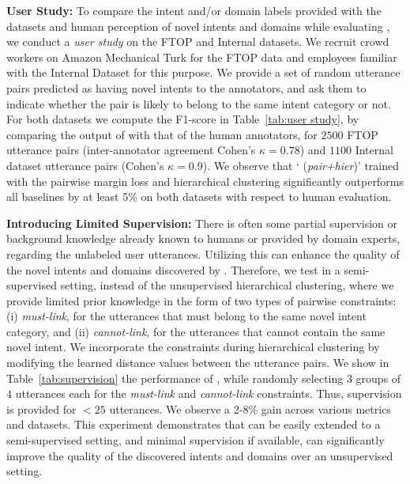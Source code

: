 \smallskip

\noindent \textbf{User Study: }
To compare the intent and/or domain labels provided with the datasets and human perception of novel intents and domains while evaluating \mname{}, we conduct a \textit{user study} on the FTOP and Internal datasets.  We recruit crowd workers on Amazon Mechanical Turk for the FTOP data and employees familiar with the Internal Dataset for this purpose. We provide a set of random utterance pairs predicted as having novel intents to the annotators, and ask them to indicate whether the pair is likely to belong to the same intent category or not. 
For both datasets we compute the F1-score in Table~\ref{tab:user study}, by comparing the output of \mname{} with that of the human annotators, for $2500$ FTOP utterance pairs (inter-annotator agreement Cohen's $\kappa = 0.78$) and $1100$ Internal dataset utterance pairs (Cohen's $\kappa = 0.9$). 
We observe that `\mname{} (\textit{pair+hier})' trained with the pairwise margin loss and hierarchical clustering significantly outperforms all baselines by at least 5\% on both datasets with respect to human evaluation.   

\smallskip

\noindent \textbf{Introducing Limited Supervision: }
There is often some partial supervision or background knowledge already known to humans or provided by domain experts, regarding the unlabeled user utterances. Utilizing this can enhance the quality of the novel intents and domains discovered by \mname{}. Therefore, we test \mname{} in a semi-supervised setting, instead of the unsupervised hierarchical clustering, where we provide limited prior knowledge in the form of two types of pairwise constraints: (i) \textit{must-link}, for the utterances that must belong to the same novel intent category, and (ii) \textit{cannot-link}, for the utterances that cannot contain the same novel intent. We incorporate the constraints during hierarchical clustering by modifying the learned distance values between the utterance pairs. We show in Table~\ref{tab:supervision} the performance of \mname{}, while randomly selecting $3$ groups of $4$ utterances each for the \textit{must-link} and \textit{cannot-link} constraints. Thus, supervision is provided for $<25$ utterances. We observe a 2-8\% gain %
across various metrics and datasets. 
This experiment demonstrates that \mname{} can be easily extended to a semi-supervised setting, and minimal supervision if available, can significantly improve the quality of the discovered intents and domains over an unsupervised setting. 
